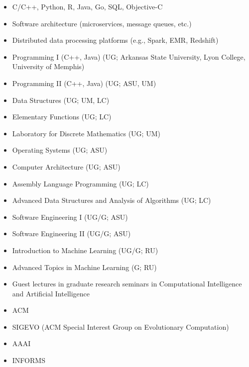 \documentclass[a4paper,10pt]{cvclean}
\begin{document}
\begin{Technical Skills}
\begin{itemize}
\item C/C++, Python, R, Java, Go, SQL, Objective-C
\item Software architecture (microservices, message queues, etc.)
\item Distributed data processing platforms (e.g., Spark, EMR, Redshift)
\end{itemize}
\end{Technical Skills}


\begin{Courses Taught}
\begin{itemize}
\item Programming I (C++, Java) (UG; Arkansas State University, Lyon College,
  University of Memphis)
\item Programming II (C++, Java) (UG; ASU, UM)
\item Data Structures (UG; UM, LC)
\item Elementary Functions (UG; LC)
\item Laboratory for Discrete Mathematics (UG; UM)
\item Operating Systems (UG; ASU)
\item Computer Architecture (UG; ASU)
\item Assembly Language Programming (UG; LC)
\item Advanced Data Structures and Analysis of Algorithms (UG; LC)
\item Software Engineering I (UG/G; ASU)
\item Software Engineering II (UG/G; ASU)
\item Introduction to Machine Learning (UG/G; RU)
\item Advanced Topics in Machine Learning (G; RU)
\item Guest lectures in graduate research seminars in Computational Intelligence
  and Artificial Intelligence
\end{itemize}
\end{Courses Taught}

\begin{Professional Societies}
\begin{itemize}
\item ACM
\item SIGEVO (ACM Special Interest Group on Evolutionary Computation)
\item AAAI
\item INFORMS
\end{itemize}
\end{Professional Societies}
\end{document}
